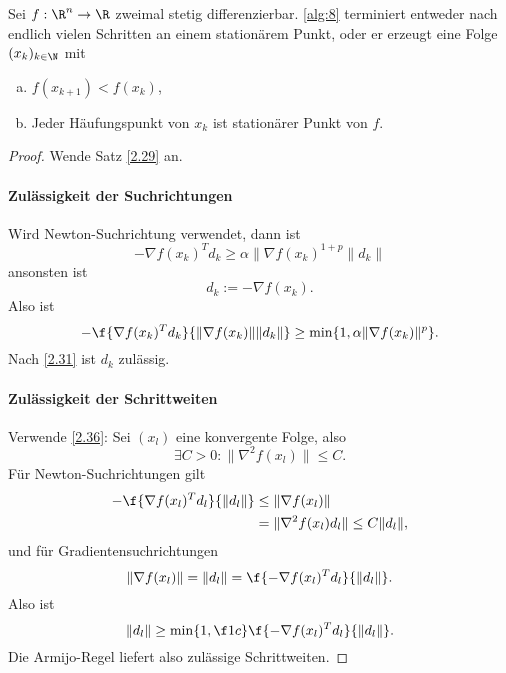 \begin{st} \label{2.57}
	Sei $f: \R^n \to \R$ zweimal stetig differenzierbar.
	\ref{alg:8} terminiert entweder nach endlich vielen Schritten an einem stationärem Punkt, oder er erzeugt eine Folge $(x_k)_{k\in\N}$ mit
	\begin{enumerate}[(a)]
		\item
			$f(x_{k+1}) < f(x_k)$,
		\item
			Jeder Häufungspunkt von $x_k$ ist stationärer Punkt von $f$.
	\end{enumerate}
	\begin{proof}
		Wende Satz \ref{2.29} an.
		\paragraph{Zulässigkeit der Suchrichtungen}
		Wird Newton-Suchrichtung verwendet, dann ist
		\[
			-\nabla f(x_k)^T d_k \ge \alpha \|\nabla f(x_k)^{1+p}\|d_k\|
		\]
		ansonsten ist
		\[
			d_k := -\nabla f(x_k).
		\]
		Also ist
		\[
			- \f {\nabla f(x_k)^T d_k}{\|\nabla f(x_k)\|\|d_k\|}
			\ge \min \{ 1, \alpha \|\nabla f(x_k)\|^p \}.
		\]
		Nach \ref{2.31} ist $d_k$ zulässig.
		\paragraph{Zulässigkeit der Schrittweiten}
		Verwende \ref{2.36}:
		Sei $(x_l)$ eine konvergente Folge, also
		\[
			\exists C > 0 : \|\nabla^2 f(x_l)\| \le C.
		\]
		Für Newton-Suchrichtungen gilt
		\begin{align*}
			- \f {\nabla f(x_l)^T d_l}{\|d_l\|}
			&\le \|\nabla f(x_l)\| \\
			&= \|\nabla^2 f(x_l) d_l\|
			\le C \|d_l\|,
		\end{align*}
		und für Gradientensuchrichtungen
		\[
			\|\nabla f(x_l)\|
			= \|d_l\|
			= \f {-\nabla f(x_l)^T d_l}{\|d_l\|}.
		\]
		Also ist
		\[
			\|d_l\|
			\ge \min \{1, \f 1c \} \f {-\nabla f(x_l)^T d_l}{\|d_l\|}.
		\]
		Die Armijo-Regel liefert also zulässige Schrittweiten.
	\end{proof}
\end{st}

